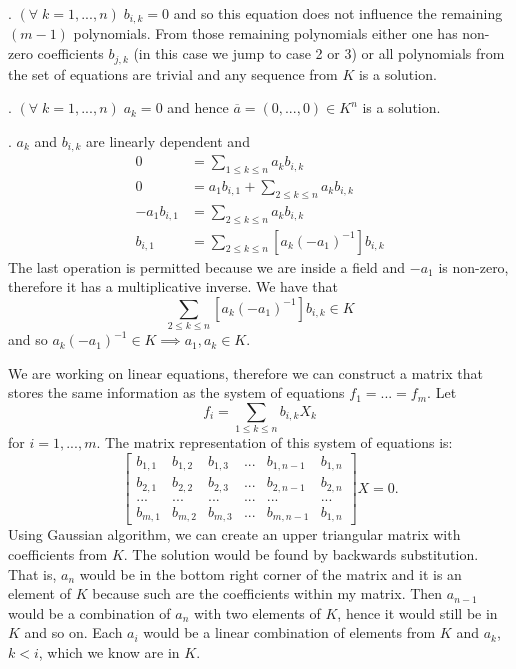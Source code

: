 \documentclass{article}
\begin{document}
. $(\forall\;k=1,...,n)\;b_{i,k}=0$ and so this equation does not influence the remaining $(m-1)$ polynomials. From those remaining polynomials either one has non-zero coefficients $b_{j, k}$ (in this case we jump to case 2 or 3) or all polynomials from the set of equations are trivial and any sequence from $K$ is a solution.

. $(\forall\;k=1,...,n)\;a_k=0$ and hence $\overline a=(0,...,0)\in K^n$ is a solution.

. $a_k$ and $b_{i, k}$ are linearly dependent and
\begin{align*}
    0&=\sum\limits_{1\leq k\leq n}a_kb_{i, k}\\
    0&=a_1b_{i, 1}+\sum\limits_{2\leq k\leq n}a_kb_{i, k}\\
    -a_1b_{i, 1}&=\sum\limits_{2\leq k\leq n}a_kb_{i, k}\\
    b_{i, 1}&=\sum\limits_{2\leq k\leq n}[a_k(-a_1)^{-1}]b_{i, k}
\end{align*}
The last operation is permitted because we are inside a field and $-a_1$ is non-zero, therefore it has a multiplicative inverse. We have that 
$$\sum\limits_{2\leq k\leq n}[a_k(-a_1)^{-1}]b_{i, k}\in K$$
and so $a_k(-a_1)^{-1}\in K\implies a_1,a_k\in K$.

\proofend

We are working on linear equations, therefore we can construct a matrix that stores the same information as the system of equations $f_1=...=f_m$. Let
$$f_i=\sum\limits_{1\leq k\leq n}b_{i, k}X_k$$
for $i=1,...,m$. The matrix representation of this system of equations is:
$$\begin{bmatrix}
    b_{1,1} & b_{1, 2} & b_{1, 3} &... &b_{1, n-1} & b_{1, n}\\
    b_{2,1} & b_{2, 2} & b_{2, 3} &... &b_{2, n-1} & b_{2, n}\\
    ...     &   ...    & ...      &... & ...       & ...\\
    b_{m,1} & b_{m, 2} & b_{m, 3} &... &b_{m, n-1} & b_{1, n}
\end{bmatrix}X=0.$$
Using Gaussian algorithm, we can create an upper triangular matrix with coefficients from $K$. The solution would be found by backwards substitution. That is, $a_n$ would be in the bottom right corner of the matrix and it is an element of $K$ because such are the coefficients within my matrix. Then $a_{n-1}$ would be a combination of $a_n$ with two elements of $K$, hence it would still be in $K$ and so on. Each $a_i$ would be a linear combination of elements from $K$ and $a_k$, $k<i$, which we know are in $K$.

\proofend
\end{document}
